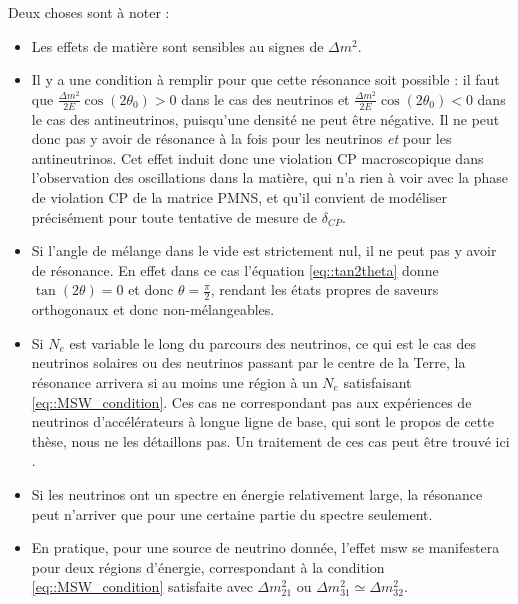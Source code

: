             Deux choses sont à noter : 
            \begin{itemize}
            	\item Les effets de matière sont sensibles au signes de $\Delta m^2$.
                \item Il y a une condition à remplir pour que cette résonance soit possible : il faut que $\frac{\Delta m^2}{2E}\cos(2\theta_0) > 0$ dans le cas des neutrinos et $\frac{\Delta m^2}{2E}\cos(2\theta_0) < 0$ dans le cas des antineutrinos, puisqu'une densité ne peut être négative. Il ne peut donc pas y avoir de résonance à la fois pour les neutrinos \textit{et} pour les antineutrinos. Cet effet induit donc une violation CP macroscopique dans l'observation des oscillations dans la matière, qui n'a rien à voir avec la phase de violation CP de la matrice PMNS, et qu'il convient de modéliser précisément pour toute tentative de mesure de $\delta_{CP}$.
                \item Si l'angle de mélange dans le vide est strictement nul, il ne peut pas y avoir de résonance. En effet dans ce cas l'équation \eqref{eq::tan2theta} donne $\tan(2\theta)=0$ et donc $\theta=\frac{\pi}{2}$, rendant les états propres de saveurs orthogonaux et donc non-mélangeables.
                \item Si $N_e$ est variable le long du parcours des neutrinos, ce qui est le cas des neutrinos solaires ou des neutrinos passant par le centre de la Terre, la résonance arrivera si au moins une région à un $N_e$ satisfaisant \eqref{eq::MSW_condition}. Ces cas ne correspondant pas aux expériences de neutrinos d'accélérateurs à longue ligne de base, qui sont le propos de cette thèse, nous ne les détaillons pas. Un traitement de ces cas peut être trouvé ici \cite{Akhmedov2000}.
                \item Si les neutrinos ont un spectre en énergie relativement large, la résonance peut n'arriver que pour une certaine partie du spectre seulement.
                \item En pratique, pour une source de neutrino donnée, l'effet \gls{msw} se manifestera pour deux régions d'énergie, correspondant à la condition \eqref{eq::MSW_condition} satisfaite avec $\Delta m^2_{21}$ ou $\Delta m^2_{31}\simeq\Delta m^2_{32}$.
            \end{itemize}
                
            
